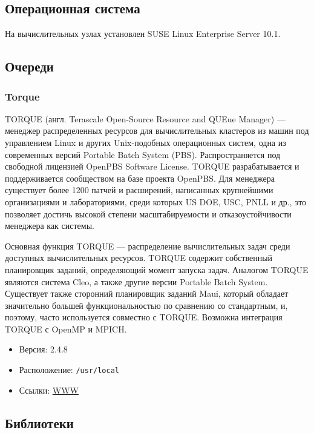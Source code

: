\documentclass[a4paper,8pt]{extreport}
\begin{document}
\subsection{Операционная система}
На вычислительных узлах установлен SUSE Linux Enterprise Server 10.1.

\subsection{Очереди}
\subsubsection{Torque}
TORQUE (англ. Terascale Open-Source Resource and QUEue Manager) — менеджер распределенных ресурсов для 
вычислительных кластеров из машин под управлением Linux и других Unix-подобных операционных систем, 
одна из современных версий Portable Batch System (PBS). Распространяется под свободной лицензией 
OpenPBS Software License. TORQUE разрабатывается и поддерживается сообществом на базе проекта OpenPBS. 
Для менеджера существует более 1200 патчей и расширений, написанных крупнейшими организациями и лабораториями, 
среди которых US DOE, USC, PNLL и др., это позволяет достичь высокой степени масштабируемости и 
отказоустойчивости менеджера как системы.

Основная функция TORQUE — распределение вычислительных задач среди доступных вычислительных ресурсов. 
TORQUE содержит собственный планировщик заданий, определяющий момент запуска задач. Аналогом TORQUE являются 
система Cleo, а также другие версии Portable Batch System. Существует также сторонний планировщик заданий Maui, 
который обладает значительно большей функциональностью по сравнению со стандартным, и, поэтому, часто 
используется совместно с TORQUE. Возможна интеграция TORQUE с OpenMP и MPICH.
\begin{itemize}
 \item Версия: 2.4.8
 \item Расположение: \verb|/usr/local|
 \item Ссылки: \href{http://www.clusterresources.com/products/torque-resource-manager.php}{WWW}
\end{itemize}

\subsection{Библиотеки}
\end{document}
